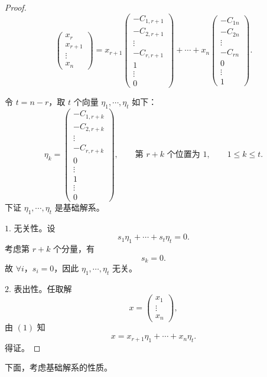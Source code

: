 \begin{proof}
\begin{equation}
\begin{pmatrix}
		x_r\\
		x_{r+1}\\
		\vdots\\
		x_n
	\end{pmatrix}
	=
	x_{r+1}
	\begin{pmatrix}
		-C_{1,r+1}\\
		-C_{2,r+1}\\
		\vdots\\
		-C_{r,r+1}\\
		1\\
		\vdots\\
		0
	\end{pmatrix}
	+\cdots+
	x_n
	\begin{pmatrix}
		-C_{1n}\\
		-C_{2n}\\
		\vdots\\
		-C_{rn}\\
		0\\
		\vdots\\
		1
	\end{pmatrix}.
	\end{equation}
	
	令 $t=n-r$，取 $t$ 个向量 $\eta_1,\cdots,\eta_t$ 如下：
	\[
	\eta_k=
	\begin{pmatrix}
		-C_{1,r+k}\\
		-C_{2,r+k}\\
		\vdots\\
		-C_{r,r+k}\\
		0\\
		\vdots\\
		1\\
		\vdots\\
		0
	\end{pmatrix},
	\qquad
	\text{第 } r+k \text{ 个位置为 }1,
	\qquad 1\leq k\leq t.
	\]
	下证 $\eta_1,\cdots,\eta_t$ 是基础解系。
	
	$1.$ 无关性。设
	\[
	s_1\eta_1+\cdots+s_t\eta_t=0.
	\]
	考虑第 $r+k$ 个分量，有
	\[
	s_k=0.
	\]
	故 $\forall i$，$s_i=0$，因此 $\eta_1,\cdots,\eta_t$ 无关。
	
	$2.$ 表出性。任取解
	\[
	x=\begin{pmatrix}x_1\\ \vdots\\ x_n\end{pmatrix},
	\]
	由 $(1)$ 知
	\[
	x=x_{r+1}\eta_1+\cdots+x_n\eta_t.
	\]
	得证。
\end{proof}

下面，考虑基础解系的性质。

